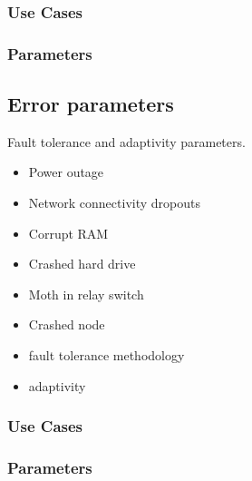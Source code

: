\subsubsection{Use Cases}
\subsubsection{Parameters}

\subsection{Error parameters} \label{ss:params-error}

Fault tolerance and adaptivity parameters.

\begin{itemize}
\item Power outage
\item Network connectivity dropouts
\item Corrupt RAM
\item Crashed hard drive
\item Moth in relay switch
\item Crashed node
\end{itemize}

\begin{itemize}
\item fault tolerance methodology
\item adaptivity
\end{itemize}

\subsubsection{Use Cases}
\subsubsection{Parameters}
